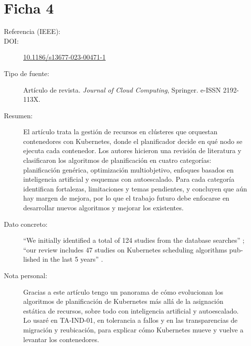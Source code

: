 \documentclass[11pt,a4paper]{article}
\newcommand{\doi}[1]{\href{https://doi.org/#1}{#1}}
\begin{document}
\section{Ficha 4}
\begin{description}
  \item[Referencia (IEEE):] 
  \item[DOI:] \doi{10.1186/s13677-023-00471-1}
  \item[Tipo de fuente:] Artículo de revista. \emph{Journal of Cloud Computing}, Springer. e-ISSN 2192-113X.
  \item[Resumen:] El artículo trata la gestión de recursos en clústeres que orquestan contenedores con Kubernetes, donde el planificador decide en qué nodo se ejecuta cada contenedor. Los autores hicieron una revisión de literatura y clasificaron los algoritmos de planificación en cuatro categorías: planificación genérica, optimización multiobjetivo, enfoques basados en inteligencia artificial y esquemas con autoescalado. Para cada categoría identifican fortalezas, limitaciones y temas pendientes, y concluyen que aún hay margen de mejora, por lo que el trabajo futuro debe enfocarse en desarrollar nuevos algoritmos y mejorar los existentes.
  \item[Dato concreto:] \foreignquote{american}{We initially identified a total of 124 studies from the database searches} \cite[p.~4]{senjab2023}; \foreignquote{american}{our review includes 47 studies on Kubernetes scheduling algorithms published in the last 5 years} \cite[p.~5]{senjab2023}.
  \item[Nota personal:] Gracias a este artículo tengo un panorama de cómo evolucionan los algoritmos de planificación de Kubernetes más allá de la asignación estática de recursos, sobre todo con inteligencia artificial y autoescalado. Lo usaré en TA-IND-01, en tolerancia a fallos y en las transparencias de migración y reubicación, para explicar cómo Kubernetes mueve y vuelve a levantar los contenedores.
\end{description}
\end{document}
